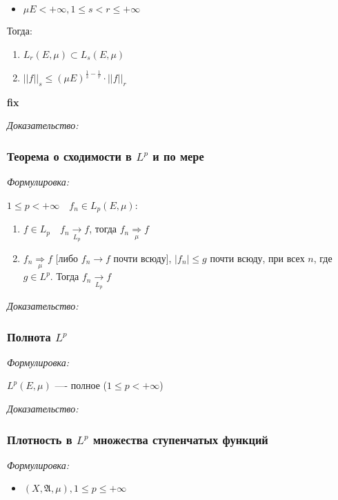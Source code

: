 \documentclass{article}
\def\goesto#1{\underset{#1}{\longrightarrow}}
\begin{document}
\begin{itemize}
    \item $\mu E < + \infty, 1 \le s < r \le +\infty$
\end{itemize}

Тогда:

\begin{enumerate}
    \item $L_r(E, \mu) \subset L_s(E, \mu)$
    \item $||f||_s \le \left(\mu E\right)^{\frac{1}{s} - \frac{1}{r}} \cdot ||f||_{r}$
\end{enumerate}

\textbf{fix}

\textit{Доказательство:}

\subsubsection{Теорема о сходимости в $L^p$ и по мере}
\textit{Формулировка:}

$1 \le p < +\infty \quad f_n \in L_p(E, \mu)$: 

\begin{enumerate}
    \item $f \in L_p \quad f_n \goesto{L_p} f$, тогда $f_n \underset{\mu}{\Longrightarrow} f$
    \item $f_n \underset{\mu}{\Longrightarrow} f$ [либо $f_n \rightarrow f$ почти всюду], $|f_n| \le g$ почти всюду, при всех $n$, где $g \in L^p$. Тогда $f_n \goesto{L_p} f$
\end{enumerate}
\textit{Доказательство:}



\subsubsection{Полнота $L^p$}
\textit{Формулировка:}

$L^p(E, \mu)$ ---- полное ($1 \le p < + \infty$)

\textit{Доказательство:}

\subsubsection{Плотность в $L^p$ множества ступенчатых функций}
\textit{Формулировка:}

\begin{itemize}
    \item $(X, \mathfrak{A}, \mu), 1 \le p \le +\infty$
\end{itemize}
\end{document}
